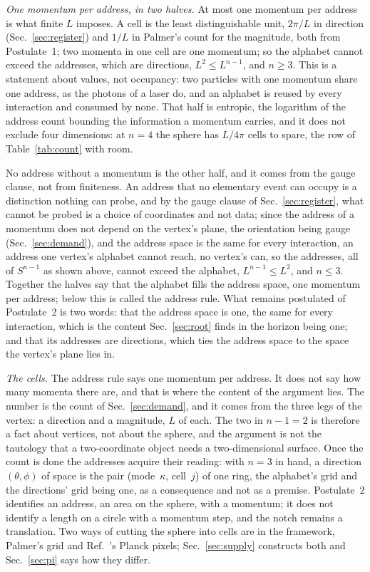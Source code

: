 \documentclass[aps,prd,twocolumn,superscriptaddress,nofootinbib]{revtex4-2}
\begin{document}
\textit{One momentum per address, in two halves.} At most one momentum per address is what finite $L$ imposes. A cell is the least distinguishable unit, $2\pi/L$ in direction (Sec.~\ref{sec:register}) and $1/L$ in Palmer's count for the magnitude, both from Postulate~1; two momenta in one cell are one momentum; so the alphabet cannot exceed the addresses, which are directions, $L^2 \le L^{n-1}$, and $n \ge 3$. This is a statement about values, not occupancy: two particles with one momentum share one address, as the photons of a laser do, and an alphabet is reused by every interaction and consumed by none. That half is entropic, the logarithm of the address count bounding the information a momentum carries, and it does not exclude four dimensions: at $n = 4$ the sphere has $L/4\pi$ cells to spare, the row of Table~\ref{tab:count} with room.

No address without a momentum is the other half, and it comes from the gauge clause, not from finiteness. An address that no elementary event can occupy is a distinction nothing can probe, and by the gauge clause of Sec.~\ref{sec:register}, what cannot be probed is a choice of coordinates and not data; since the address of a momentum does not depend on the vertex's plane, the orientation being gauge (Sec.~\ref{sec:demand}), and the address space is the same for every interaction, an address one vertex's alphabet cannot reach, no vertex's can, so the addresses, all of $S^{n-1}$ as shown above, cannot exceed the alphabet, $L^{n-1} \le L^2$, and $n \le 3$. Together the halves say that the alphabet fills the address space, one momentum per address; below this is called the address rule. What remains postulated of Postulate~2 is two words: that the address space is one, the same for every interaction, which is the content Sec.~\ref{sec:root} finds in the horizon being one; and that its addresses are directions, which ties the address space to the space the vertex's plane lies in.

\textit{The cells.} The address rule says one momentum per address. It does not say how many momenta there are, and that is where the content of the argument lies. The number is the count of Sec.~\ref{sec:demand}, and it comes from the three legs of the vertex: a direction and a magnitude, $L$ of each. The two in $n-1 = 2$ is therefore a fact about vertices, not about the sphere, and the argument is not the tautology that a two-coordinate object needs a two-dimensional surface. Once the count is done the addresses acquire their reading: with $n = 3$ in hand, a direction $(\theta,\phi)$ of space is the pair (mode~$\kappa$, cell~$j$) of one ring, the alphabet's grid and the directions' grid being one, as a consequence and not as a premise. Postulate~2 identifies an address, an area on the sphere, with a momentum; it does not identify a length on a circle with a momentum step, and the notch remains a translation. Two ways of cutting the sphere into cells are in the framework, Palmer's grid and Ref.~\cite{korytko2026}'s Planck pixels; Sec.~\ref{sec:supply} constructs both and Sec.~\ref{sec:pi} says how they differ.
\end{document}
